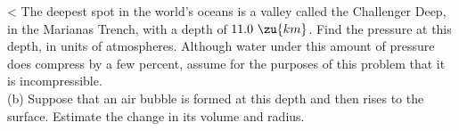 <%
The deepest spot in the world's oceans is a valley called the Challenger Deep, in the Marianas Trench,
with a depth of $11.0\ \zu{km}$. Find the pressure at this depth, in units of atmospheres. Although
water under this amount of pressure does compress by a few percent, assume for the purposes of this
problem that it is incompressible.\\
(b) Suppose that an air bubble is formed at this depth and then rises to the surface. Estimate the
change in its volume and radius.
